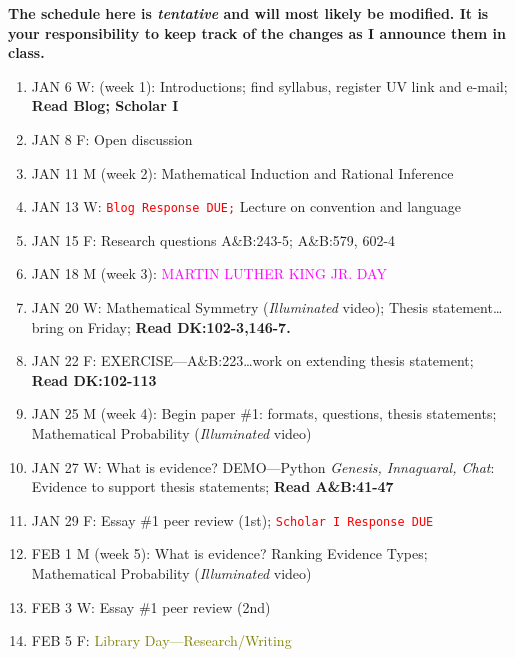 % 
% 
% 
% 
% 
% 

   {\bf The schedule here is {\it tentative} and will most likely be modified. It is your responsibility to keep track of the changes as I announce them in class.}\\
   \begin{enumerate}
\item JAN 6 W: (week 1): Introductions; find syllabus, register UV link and e-mail; \textbf{Read Blog; Scholar I}
\item[] JAN 8 F: Open discussion
\item  JAN 11 M (week 2): Mathematical Induction and Rational Inference 
\item[] JAN 13 W: \textcolor{red}{\texttt{Blog Response DUE;}} Lecture on convention and language  
\item[] JAN 15 F: Research questions A\&B:243-5; A\&B:579, 602-4

\item  JAN 18 M (week 3): \textcolor{magenta}{MARTIN LUTHER KING JR. DAY}
\item[] JAN 20 W: Mathematical Symmetry ({\sl Illuminated} video); Thesis statement\ldots bring on Friday; \textbf{Read DK:102-3,146-7.}
\item[] JAN 22 F: EXERCISE---A\&B:223\ldots work on extending thesis statement; \textbf{Read DK:102-113}

\item  JAN 25 M (week 4): Begin paper \#1: formats, questions, thesis statements; Mathematical Probability ({\sl Illuminated} video)
\item[] JAN 27 W: What is evidence? DEMO---Python {\sl Genesis, Innaguaral, Chat}: Evidence to support thesis statements; \textbf{Read A\&B:41-47}
\item[] JAN 29 F: Essay \#1 peer review (1st); \textcolor{red}{\texttt{Scholar I Response DUE}} 

\item FEB 1 M (week 5): What is evidence? Ranking Evidence Types; Mathematical Probability ({\sl Illuminated} video)
\item[] FEB 3 W: Essay \#1 peer review (2nd)
\item[] FEB 5 F: \textcolor{olive}{Library Day---Research/Writing}


\end{enumerate}
